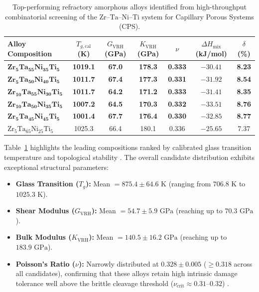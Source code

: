 \documentclass[aps,prmaterials,reprint,superscriptaddress,amsmath,amssymb,floatfix]{revtex4-2}
\begin{document}
\begin{table}[t]
\caption{\label{tab:candidates}Top-performing refractory amorphous alloys identified from high-throughput combinatorial screening of the $\text{Zr--Ta--Ni--Ti}$ system for Capillary Porous Systems (CPS).}
\begin{ruledtabular}
\begin{tabular}{l c c c c c c}
Alloy Composition & $T_{g,\text{cal}}$ (K) & $G_{\text{VRH}}$ (GPa) & $K_{\text{VRH}}$ (GPa) & $\nu$ & $\Delta H_{\text{mix}}$ (kJ/mol) & $\delta$ (\%) \\
\hline
$\mathbf{Zr_5Ta_{55}Ni_{35}Ti_5}$ & \textbf{1019.1} & \textbf{67.0} & \textbf{178.3} & \textbf{0.333} & $\mathbf{-30.41}$ & \textbf{8.23} \\
$\mathbf{Zr_5Ta_{50}Ni_{40}Ti_5}$ & \textbf{1011.7} & \textbf{67.4} & \textbf{177.3} & \textbf{0.331} & $\mathbf{-31.92}$ & \textbf{8.54} \\
$\mathbf{Zr_{10}Ta_{55}Ni_{30}Ti_5}$ & \textbf{1011.7} & \textbf{64.2} & \textbf{171.2} & \textbf{0.333} & $\mathbf{-31.41}$ & \textbf{8.35} \\
$\mathbf{Zr_{10}Ta_{50}Ni_{35}Ti_5}$ & \textbf{1007.2} & \textbf{64.5} & \textbf{170.3} & \textbf{0.332} & $\mathbf{-33.51}$ & \textbf{8.76} \\
$\mathbf{Zr_5Ta_{45}Ni_{45}Ti_5}$ & \textbf{1001.4} & \textbf{67.7} & \textbf{176.4} & \textbf{0.330} & $\mathbf{-32.85}$ & \textbf{8.77} \\
$\text{Zr}_5\text{Ta}_{65}\text{Ni}_{25}\text{Ti}_5$ & 1025.3 & 66.4 & 180.1 & 0.336 & $-25.65$ & 7.37 \\
\end{tabular}
\end{ruledtabular}
\end{table}

Table~\ref{tab:candidates} highlights the leading compositions ranked by calibrated glass transition temperature and topological stability \cite{Egami1997,Johnson2005,Inoue2000Acta}. The overall candidate distribution exhibits exceptional structural parameters:
\begin{itemize}
\item \textbf{Glass Transition ($T_g$):} Mean $= 875.4 \pm 64.6\text{ K}$ (ranging from $706.8\text{ K}$ to $1025.3\text{ K}$).
\item \textbf{Shear Modulus ($G_{\text{VRH}}$):} Mean $= 54.7 \pm 5.9\text{ GPa}$ (reaching up to $70.3\text{ GPa}$).
\item \textbf{Bulk Modulus ($K_{\text{VRH}}$):} Mean $= 140.5 \pm 16.2\text{ GPa}$ (reaching up to $183.9\text{ GPa}$).
\item \textbf{Poisson's Ratio ($\nu$):} Narrowly distributed at $0.328 \pm 0.005$ ($\ge 0.318$ across all candidates), confirming that these alloys retain high intrinsic damage tolerance well above the brittle cleavage threshold ($\nu_{\text{crit}} \approx 0.31$--$0.32$) \cite{Lewandowski2005,Pugh1954}.
\end{itemize}
\end{document}
